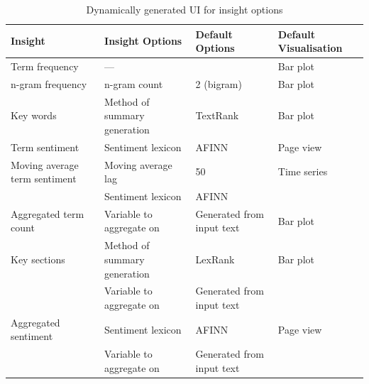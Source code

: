\documentclass[11pt, a4paper, titlepage]{report}
\begin{document}
\begin{landscape}
\begin{table}
  \centering
  \begin{tabular}{llll}
    \toprule
    Insight                       & Insight Options              & Default Options           & Default Visualisation \\
    \midrule
    Term frequency                & ---                          &                           & Bar plot              \\
    n-gram frequency              & n-gram count                 & 2 (bigram)                & Bar plot              \\
    Key words                     & Method of summary generation & TextRank                  & Bar plot              \\
    Term sentiment                & Sentiment lexicon            & AFINN                     & Page view             \\
    Moving average term sentiment & Moving average lag           & 50                        & Time series           \\
                                  & Sentiment lexicon            & AFINN                     &                       \\
    Aggregated term count         & Variable to aggregate on     & Generated from input text & Bar plot              \\
    Key sections                  & Method of summary generation & LexRank                   & Bar plot              \\
                                  & Variable to aggregate on     & Generated from input text &                       \\
    Aggregated sentiment          & Sentiment lexicon            & AFINN                     & Page view             \\
                                  & Variable to aggregate on     & Generated from input text &                       \\
    \bottomrule
  \end{tabular}
  \caption{Dynamically generated UI for insight options\label{tab:ui-insight-opts}}
\end{table}
\end{landscape}
\end{document}
